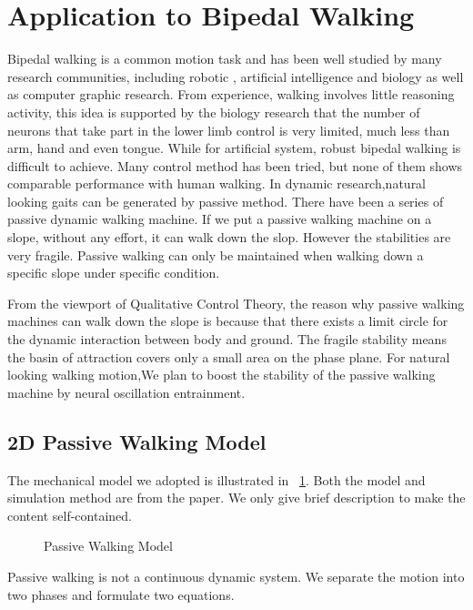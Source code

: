 \section{Application to Bipedal Walking}
Bipedal walking is a common motion task and has been well studied by many research communities, including robotic \cite{Raibert1986}, artificial intelligence and biology as well as computer graphic research.
From experience, walking involves little reasoning activity, this idea is supported by the biology research that the number of neurons that take part in the lower limb control is very limited, much less than arm, hand and even tongue.
While for artificial system, robust bipedal walking is difficult to achieve. 
Many control method has been tried, but none of them shows comparable performance with human walking. 
In dynamic research,natural looking gaits can be generated by passive method.
There have been a series of passive dynamic walking machine\citep{McGeer1990,McGeer1990a}. 
If we put a passive walking machine on a slope, without any effort, it can walk down the slop. 
However the stabilities are very fragile. 
Passive walking can only be maintained when walking down a specific slope under specific condition.

From the viewport of Qualitative Control Theory, 
the reason why passive walking machines can walk down the slope is because that there exists a limit circle for the dynamic interaction between body and ground.
The fragile stability means the basin of attraction covers only a small area on the phase plane.
For natural looking walking motion,We plan to boost the stability of the passive walking machine by neural oscillation entrainment. 

\subsection{2D Passive Walking Model}
The mechanical model we adopted is illustrated in \figurename ~\ref{fig:2d_walker}. 
Both the model and simulation method are from the paper\citep{Wisse2005}. 
We only give brief description to make the content self-contained.

\begin{figure}
\begin{center}
\scalebox{0.5}{

}
\caption{Passive Walking Model}
\label{fig:2d_walker}
\end{center}
\end{figure}

Passive walking is not a continuous dynamic system. 
We separate the motion into two phases and formulate two equations.

